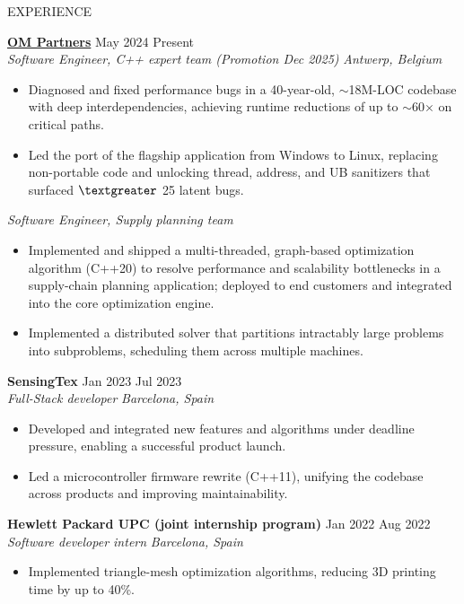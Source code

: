 \documentclass{resume} %
\begin{document}

\begin{rSection}{EXPERIENCE}

    \href{https://omp.com/}{\textbf{OM Partners}}                    \hfill  May 2024 \textendash{} Present \\
    \textit{Software Engineer, C++ expert team (Promotion Dec 2025)} \hfill \textit{Antwerp, Belgium}
    \begin{itemize}
        \item {Diagnosed and fixed performance bugs in a 40-year-old, ${\sim}$18M-LOC codebase with deep interdependencies, achieving runtime reductions of up to ${\sim}$60${\times}$ on critical paths.}
        \item {Led the port of the flagship application from Windows to Linux, replacing non-portable code and unlocking thread, address, and UB sanitizers that surfaced ${\textgreater}$ 25 latent bugs.}
    \end{itemize}
    \textit{Software Engineer, Supply planning team}
    \begin{itemize}
        \item {Implemented and shipped a multi-threaded, graph-based optimization algorithm (C++20) to resolve performance and scalability bottlenecks in a supply-chain planning application; deployed to end customers and integrated into the core optimization engine.}
        \item {Implemented a distributed solver that partitions intractably large problems into subproblems, scheduling them across multiple machines.}
    \end{itemize}

    \textbf{SensingTex}           \hfill Jan 2023 \textendash{} Jul 2023 \\
    \textit{Full-Stack developer} \hfill \textit{Barcelona, Spain}
    \begin{itemize}
        \item Developed and integrated new features and algorithms under deadline pressure, enabling a successful product launch.
        \item Led a microcontroller firmware rewrite (C++11), unifying the codebase across products and improving maintainability.
    \end{itemize}

    \textbf{Hewlett Packard \textendash{} UPC (joint internship program)} \hfill Jan 2022 \textendash{} Aug 2022\\
    \textit{Software developer intern}                                    \hfill \textit{Barcelona, Spain}
    \begin{itemize}
        \item Implemented triangle-mesh optimization algorithms, reducing 3D printing time by up to 40\%.
    \end{itemize}

\end{rSection} 
\end{document}
